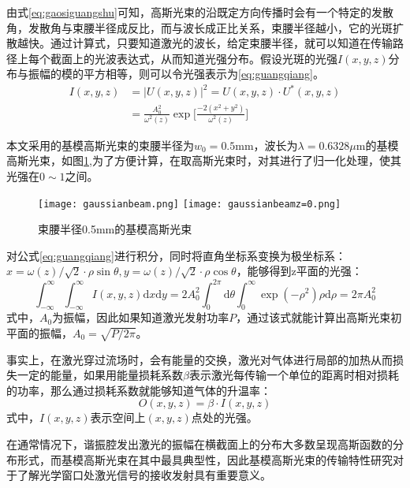 由式\eqref{eq:gaosiguangshu}可知，高斯光束的沿既定方向传播时会有一个特定的发散角，发散角与束腰半径成反比，而与波长成正比关系，束腰半径越小，它的光斑扩散越快。通过计算式，只要知道激光的波长，给定束腰半径，就可以知道在传输路径上每个截面上的光波表达式，从而知道光强分布。假设光斑的光强$I(x,y,z)$分布与振幅的模的平方相等，则可以令光强表示为\eqref{eq:guangqiang}。
\begin{equation}
\begin{aligned}
I(x,y,z)&=\big|U(x,y,z)\big|^2=U(x,y,z)\cdot U^*(x,y,z)\\
&=\frac{A_0^2}{\omega^2(z)}\exp\big[\frac{-2(x^2+y^2)}{\omega^2(z)}\big]
\end{aligned}
\label{eq:guangqiang}
\end{equation}

本文采用的基模高斯光束的束腰半径为$w_0=0.5$mm，波长为$\lambda=0.6328\mu$m的基模高斯光束，如图\ref{fig:gaussianbeam},为了方便计算，在取高斯光束时，对其进行了归一化处理，使其光强在$0\sim 1$之间。
\begin{figure}[bhp]
\centering
\texttt{[image: gaussianbeam.png]}
\texttt{[image: gaussianbeamz=0.png]}
\caption{束腰半径0.5mm的基模高斯光束}
\label{fig:gaussianbeam}
\end{figure}

对公式\eqref{eq:guangqiang}进行积分，同时将直角坐标系变换为极坐标系：$x=\omega(z)/\sqrt{2}\cdot\rho\sin\theta,y=\omega(z)/\sqrt{2}\cdot\rho\cos\theta$，能够得到z平面的光强：
\begin{equation}
\int_{-\infty}^{\infty}\int_{-\infty}^{\infty}I(x,y,z)\text{d}x\text{d}y=2A_0^2\int_0^{2\pi}\text{d}\theta\int_0^\infty\exp(-\rho^2)\rho\text{d}\rho=2\pi A_0^2
\end{equation}
式中，$A_0$为振幅，因此如果知道激光发射功率$P$，通过该式就能计算出高斯光束初平面的振幅，$A_0=\sqrt{P/2\pi}$。

事实上，在激光穿过流场时，会有能量的交换，激光对气体进行局部的加热从而损失一定的能量，如果用能量损耗系数$\beta$表示激光每传输一个单位的距离时相对损耗的功率，那么通过损耗系数就能够知道气体的升温率：
\begin{equation}
O(x,y,z)=\beta\cdot I(x,y,z)
\end{equation}
式中，$I(x,y,z)$表示空间上$(x,y,z)$点处的光强。

在通常情况下，谐振腔发出激光的振幅在横截面上的分布大多数呈现高斯函数的分布形式，而基模高斯光束在其中最具典型性，因此基模高斯光束的传输特性研究对于了解光学窗口处激光信号的接收发射具有重要意义。

